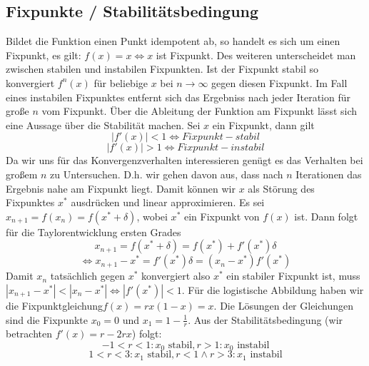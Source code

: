 \documentclass[11,5pt, twoside]{article}
\begin{document}
\subsection{Fixpunkte / Stabilitätsbedingung}
Bildet die Funktion einen Punkt idempotent ab, so handelt es sich um einen Fixpunkt, es gilt: $f(x)=x \iff x$ ist Fixpunkt. Des weiteren unterscheidet man zwischen stabilen und instabilen Fixpunkten. Ist der Fixpunkt stabil so konvergiert $f^n(x)$ für beliebige $x$ bei $n \rightarrow \infty$ gegen diesen Fixpunkt. Im Fall eines instabilen Fixpunktes entfernt sich das Ergebniss nach jeder Iteration für große $n$ vom Fixpunkt.
\newline
Über die Ableitung der Funktion am Fixpunkt lässt sich eine Aussage über die Stabilität machen. Sei $x$ ein Fixpunkt, dann gilt
\begin{equation} |f'(x)|<1 \iff Fixpunkt-stabil \end{equation}
\begin{equation} |f'(x)|>1 \iff Fixpunkt-instabil \end{equation}
Da wir uns für das Konvergenzverhalten interessieren genügt es das Verhalten bei großem $n$ zu Untersuchen. D.h. wir gehen davon aus, dass nach $n$ Iterationen das Ergebnis nahe am Fixpunkt liegt. Damit können wir $x$ als Störung des Fixpunktes $x^*$ ausdrücken und linear approximieren. Es sei $x_{n+1} = f(x_n)=f(x^*+\delta)$, wobei $x^*$ ein Fixpunkt von $f(x)$ ist. Dann folgt für die Taylorentwicklung ersten Grades
\begin{equation}
x_{n+1} = f(x^*+\delta)=f(x^*)+f'(x^*)\delta
\end{equation}
\begin{equation}
\Leftrightarrow x_{n+1} - x^* = f'(x^*)\delta = (x_n - x^*)f'(x^*)
\end{equation}
Damit $x_n$ tatsächlich gegen $x^*$ konvergiert also $x^*$ ein stabiler Fixpunkt ist, muss $|x_{n+1}-x^*| < |x_n-x^*| \Leftrightarrow |f'(x^*)|<1$.
\newline
Für die logistische Abbildung haben wir die Fixpunktgleichung$ f(x)=rx(1-x)=x $. Die Lösungen der Gleichungen sind die Fixpunkte $x_{0}=0$ und $x_{1}=1-\frac{1}{r}$. Aus der Stabilitätsbedingung (wir betrachten $f'(x)=r-2rx$) folgt:
\begin{equation}
-1 < r < 1: x_{0} \text{ stabil}, r > 1: x_{0} \text{ instabil}
\end{equation}
\begin{equation}
1 < r < 3: x_1 \text{ stabil}, r<1 \wedge  r> 3: x_1 \text{ instabil}
\end{equation}
\end{document}
